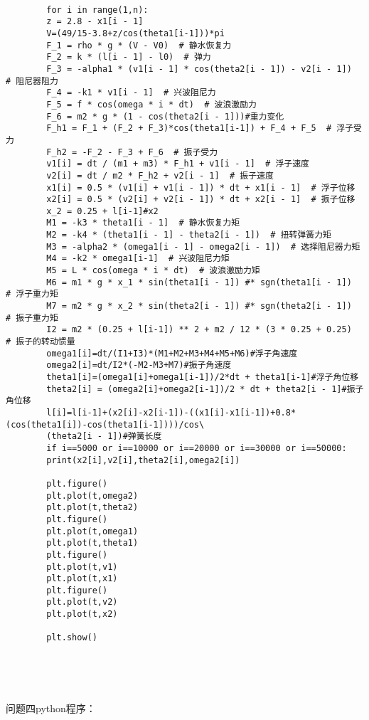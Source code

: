 \documentclass[a4paper,12pt]{article}
\begin{document}
\begin{lstlisting}
		
		for i in range(1,n):
		z = 2.8 - x1[i - 1]
		V=(49/15-3.8+z/cos(theta1[i-1]))*pi
		F_1 = rho * g * (V - V0)  # 静水恢复力
		F_2 = k * (l[i - 1] - l0)  # 弹力
		F_3 = -alpha1 * (v1[i - 1] * cos(theta2[i - 1]) - v2[i - 1])  # 阻尼器阻力
		F_4 = -k1 * v1[i - 1]  # 兴波阻尼力
		F_5 = f * cos(omega * i * dt)  # 波浪激励力
		F_6 = m2 * g * (1 - cos(theta2[i - 1]))#重力变化
		F_h1 = F_1 + (F_2 + F_3)*cos(theta1[i-1]) + F_4 + F_5  # 浮子受力
		F_h2 = -F_2 - F_3 + F_6  # 振子受力
		v1[i] = dt / (m1 + m3) * F_h1 + v1[i - 1]  # 浮子速度
		v2[i] = dt / m2 * F_h2 + v2[i - 1]  # 振子速度
		x1[i] = 0.5 * (v1[i] + v1[i - 1]) * dt + x1[i - 1]  # 浮子位移
		x2[i] = 0.5 * (v2[i] + v2[i - 1]) * dt + x2[i - 1]  # 振子位移
		x_2 = 0.25 + l[i-1]#x2
		M1 = -k3 * theta1[i - 1]  # 静水恢复力矩
		M2 = -k4 * (theta1[i - 1] - theta2[i - 1])  # 扭转弹簧力矩
		M3 = -alpha2 * (omega1[i - 1] - omega2[i - 1])  # 选择阻尼器力矩
		M4 = -k2 * omega1[i-1]  # 兴波阻尼力矩
		M5 = L * cos(omega * i * dt)  # 波浪激励力矩
		M6 = m1 * g * x_1 * sin(theta1[i - 1]) #* sgn(theta1[i - 1])  # 浮子重力矩
		M7 = m2 * g * x_2 * sin(theta2[i - 1]) #* sgn(theta2[i - 1])  # 振子重力矩
		I2 = m2 * (0.25 + l[i-1]) ** 2 + m2 / 12 * (3 * 0.25 + 0.25)  # 振子的转动惯量
		omega1[i]=dt/(I1+I3)*(M1+M2+M3+M4+M5+M6)#浮子角速度
		omega2[i]=dt/I2*(-M2-M3+M7)#振子角速度
		theta1[i]=(omega1[i]+omega1[i-1])/2*dt + theta1[i-1]#浮子角位移
		theta2[i] = (omega2[i]+omega2[i-1])/2 * dt + theta2[i - 1]#振子角位移
		l[i]=l[i-1]+(x2[i]-x2[i-1])-((x1[i]-x1[i-1])+0.8*(cos(theta1[i])-cos(theta1[i-1])))/cos\
		(theta2[i - 1])#弹簧长度
		if i==5000 or i==10000 or i==20000 or i==30000 or i==50000:
		print(x2[i],v2[i],theta2[i],omega2[i])
		
		plt.figure()
		plt.plot(t,omega2)
		plt.plot(t,theta2)
		plt.figure()
		plt.plot(t,omega1)
		plt.plot(t,theta1)
		plt.figure()
		plt.plot(t,v1)
		plt.plot(t,x1)
		plt.figure()
		plt.plot(t,v2)
		plt.plot(t,x2)
		
		plt.show()
		
		
		
		
	\end{lstlisting}
	问题四python程序：
\end{document}
